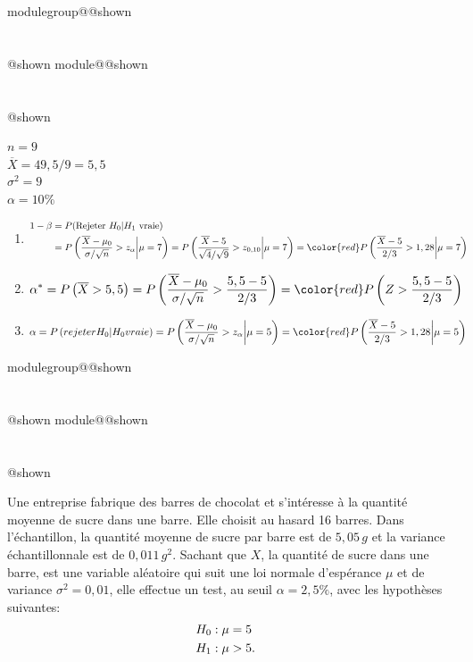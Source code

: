 \documentclass{Evaluation}
\makeatletter
\newcommand{\currentmodulekey}{}
\newcommand{\currentmoduletitle}{}
\newcommand{\currentgroupkey}{}
\newcommand{\currentgrouptitle}{}
\newcommand{\showmoduleifneeded}{%
  \ifx\currentgroupkey\empty\else
    \expandafter\ifx\csname modulegroup@\currentgroupkey @shown\endcsname\relax
      \section*{\currentgrouptitle}%
      \expandafter\gdef\csname modulegroup@\currentgroupkey @shown\endcsname{1}%
    \fi
  \fi
  \expandafter\ifx\csname module@\currentmodulekey @shown\endcsname\relax
    \section*{\currentmoduletitle}%
    \expandafter\gdef\csname module@\currentmodulekey @shown\endcsname{1}%
  \fi
}
\newenvironment{A22}{\showmoduleifneeded}{}
\newenvironment{H26}{\showmoduleifneeded}{}
\makeatother
\begin{document}
\begin{questions}
\begin{A22}
\begin{solution}
	$n = 9$\\
	$\overline{X}=49,5/9 = 5,5$\\
	$\sigma^2 = 9$\\
	$\alpha=10\%$
	\begin{enumerate}
		\item \begin{align*}
		1-\beta
		&= P(\text{Rejeter}~ H_0| H_1~ \text{vraie}) \cr
		&= P\left( \frac{\overline{X}-\mu_0}{\sigma/\sqrt{n}} > z_{\alpha}\bigg| \mu = 7 \right)
		= P\left( \frac{\overline{X}-5}{ \sqrt{4} /\sqrt{9}} > z_{0,10}\bigg| \mu = 7 \right)
		= {\color{red} P\left( \frac{\overline{X}-5}{ 2 / 3} > 1,28 \bigg| \mu = 7 \right) }
		\end{align*}
		\item \begin{align*}
			\alpha^* &= P\left(\overline{X} > 5,5\right)
			= P\left(\frac{\overline{X} - \mu_0}{\sigma/\sqrt{n}} > \frac{5,5-5}{2/3} \right)
			=  {\color{red} P\left( Z > \frac{5,5-5}{2/3} \right) }
		\end{align*}
		\item \begin{align*}
		\alpha &= P\left(rejeter H_0 | H_0 vraie \right)
		= P\left(\frac{\overline{X} - \mu_0}{\sigma/\sqrt{n}} > z_\alpha \bigg| \mu=5 \right)
		=  {\color{red} P\left( \frac{\overline{X} - 5}{2/3} > 1,28 \bigg| \mu=5 \right) }
		\end{align*}
	\end{enumerate}
\end{solution}

\end{A22}

\begin{H26}
\question {} %
Une entreprise fabrique des barres de chocolat et s'intéresse à la quantité moyenne de sucre dans une barre. Elle choisit au hasard 16 barres. Dans l'échantillon, la quantité moyenne de sucre par barre est de $5,05 \,g$ et la variance échantillonnale est de $0,011 \, g^2$. Sachant que $X$, la quantité de sucre dans une barre, est une variable aléatoire qui suit une loi normale d'espérance $\mu$ et de variance $\sigma^2=0,01$, elle effectue un test, au seuil $\alpha=2,5\%$, avec les hypothèses suivantes:
\begin{align*}
	H_0 &: \mu = 5 \cr
	H_1 &: \mu > 5.
\end{align*}


\end{H26}
\end{questions}
\end{document}
